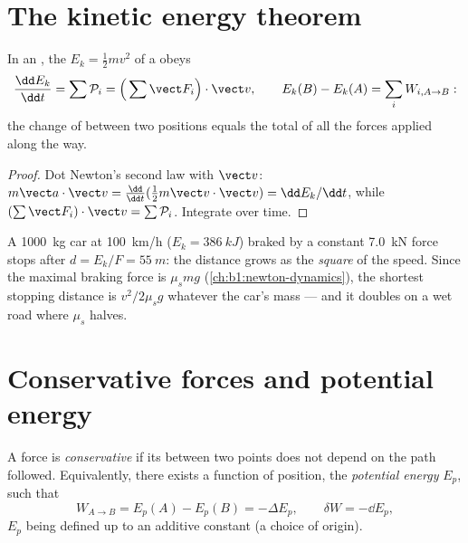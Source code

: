 \section{The kinetic energy theorem}

\begin{theorem}\label{thm:b1:work-and-energy:ke}
In an , the \emph{} $E_k = \tfrac12 mv^2$ of
a  obeys
\[
\frac{\dd E_k}{\dd t} = \sum\mathcal P_i = \Big(\sum\vect F_i\Big)\cdot\vect v,
\qquad
E_k(B) - E_k(A) = \sum_i W_{i,A\to B}:
\]
the change of  between two positions equals the total 
of all the forces applied along the way.
\end{theorem}

\begin{proof}
Dot Newton's second law with $\vect v$: $m\vect a\cdot\vect v =
\tfrac{\dd}{\dd t}(\tfrac12 m\vect v\cdot\vect v) = \dd E_k/\dd t$, while
$(\sum\vect F_i)\cdot\vect v = \sum\mathcal P_i$. Integrate over time.
\end{proof}

\begin{example}\label{ex:b1:work-and-energy:braking}
A \qty{1000}{kg} car at \qty{100}{km/h} ($E_k = \qty{386}{kJ}$) braked by
a constant \qty{7.0}{kN} force stops after $d = E_k/F = \qty{55}{m}$:
the distance grows as the \emph{square} of the speed. Since the
maximal braking force is $\mu_smg$ (\cref{ch:b1:newton-dynamics}), the
shortest stopping distance is $v^2/2\mu_sg$ whatever the car's mass ---
and it doubles on a wet road where $\mu_s$ halves.
\end{example}

\section{Conservative forces and potential energy}

\begin{definition}\label{def:b1:work-and-energy:conservative}
A force is \emph{conservative} if its  between two points does not
depend on the path followed. Equivalently, there exists a function of
position, the \emph{potential energy} $E_p$, such that
\[
W_{A\to B} = E_p(A) - E_p(B) = -\Delta E_p ,
\qquad \delta W = -\dd E_p ,
\]
$E_p$ being defined up to an additive constant (a choice of origin).
\end{definition}

